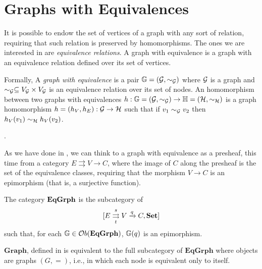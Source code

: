 \section{Graphs with Equivalences}

It is possible to endow the set of vertices of a graph with any sort of relation, requiring that such relation is preserved by homomorphisms. The ones we are interested in are \emph{equivalence relations}.
A graph with equivalence is a graph with an equivalence relation defined over its set of vertices.

Formally,  A \emph{graph with equivalence} is a pair $\mathbb{G} = (\mathcal{G}, \sim_{\mathcal{G}})$ where $\mathcal{G}$ is a graph and $\sim_{\mathcal{G}} \subseteq V_{\mathcal{G}}\times V_{\mathcal{G}}$ is an equivalence relation over its set of nodes. An homomorphism between two graphs with equivalences $h :\mathbb{G} = (\mathcal{G}, \sim_{\mathcal{G}})\rightarrow \mathbb{H} = (\mathcal{H}, \sim_{\mathcal{H}})$ is a graph homomorphism $h = (h_V, h_E):\mathcal{G} \rightarrow \mathcal{H}$ such that if $v_1 \sim_{\mathcal{G}} v_2$ then $h_V(v_1) \sim_{\mathcal{H}} h_V(v_2)$.

.

As we have done in , we can think to a graph with equivalence as a presheaf, this time from a category $E \rightrightarrows V \rightarrow C$, where the image of $C$ along the presheaf is the set of the equivalence classes, requiring that the morphism $V\rightarrow C$ is an epimorphism (that is, a surjective function).

\begin{definition}
    The category $\mathbf{EqGrph}$ is the subcategory of $$[E \mathrel{\mathop{\rightrightarrows}^{s}_{t}} V \xrightarrow{q} C, \mathbf{Set}]$$ such that, for each $\mathbb{G} \in \mathcal{O}b(\mathbf{EqGrph})$, $\mathbb{G}(q)$ is an epimorphism. 
\end{definition}

\begin{obs}
    $\mathbf{Graph}$, defined in  is equivalent to the full subcategory of $\mathbf{EqGrph}$ where objects are graphs $(G, =)$, i.e., in which each node is equivalent only to itself.
\end{obs}


